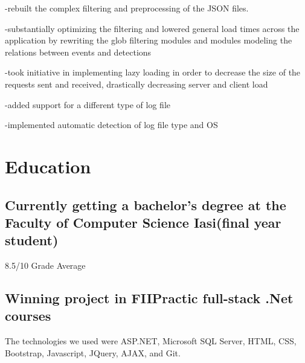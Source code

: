 \documentclass[a4paper,hidelinks,11pt]{article}
\begin{document}
-rebuilt the complex filtering and preprocessing of the JSON files.

-substantially optimizing the filtering and lowered general load times across the application by rewriting the glob filtering modules and modules modeling the relations between events and detections

-took initiative in implementing lazy loading in order to decrease the size of the requests sent and received, drastically decreasing server and client load

-added support for a different type of log file

-implemented automatic detection of log file type and OS



\section{Education}
\subsection{Currently getting a bachelor's degree at 
the Faculty of Computer Science Iasi(final year student)}
 8.5/10 Grade Average


\subsection{Winning project in FIIPractic full-stack .Net courses}

The technologies we used were ASP.NET, Microsoft SQL Server, HTML, CSS, Bootstrap, Javascript,
JQuery, AJAX, and Git. 
\end{document}

